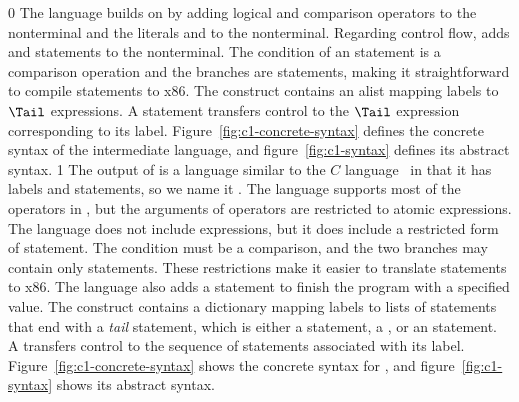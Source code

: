 \documentclass[7x10]{TimesAPriori_MIT}%
\def\racketEd{0}
\def\pythonEd{1}
\def\edition{1}
\newcommand{\pythonColor}[0]{}
\numberwithin{theorem}{chapter}
\numberwithin{definition}{chapter}
\numberwithin{equation}{chapter}
\begin{document}
{\if\edition\racketEd
%
The \LangCIf{} language builds on \LangCVar{} by adding logical and
comparison operators to the \Exp{} nonterminal and the literals
\TRUE{} and \FALSE{} to the \Arg{} nonterminal.  Regarding control
flow, \LangCIf{} adds  and  statements to the
\Tail{} nonterminal. The condition of an  statement is a
comparison operation and the branches are  statements,
making it straightforward to compile  statements to x86.  The
 construct contains an alist mapping labels to $\Tail$
expressions. A  statement transfers control to the $\Tail$
expression corresponding to its label.
%
Figure~\ref{fig:c1-concrete-syntax} defines the concrete syntax of the
\LangCIf{} intermediate language, and figure~\ref{fig:c1-syntax}
defines its abstract syntax.
%
\fi}
%
{\if\edition\pythonEd\pythonColor
%
The output of  is a language similar to the
$C$ language~\citep{Kernighan:1988nx} in that it has labels and
 statements, so we name it \LangCIf{}.  
%
The \LangCIf{} language supports most of the operators in \LangIf{}, but
the arguments of operators are restricted to atomic expressions. The
\LangCIf{} language does not include  expressions, but it does
include a restricted form of  statement. The condition must be
a comparison, and the two branches may contain only 
statements. These restrictions make it easier to translate 
statements to x86.  The \LangCIf{} language also adds a 
statement to finish the program with a specified value.
%
The  construct contains a dictionary mapping labels to
lists of statements that end with a \emph{tail} statement, which is
either a  statement, a , or an
 statement.
%
A  transfers control to the sequence of statements
associated with its label.
%
Figure~\ref{fig:c1-concrete-syntax} shows the concrete syntax for \LangCIf{},
and figure~\ref{fig:c1-syntax} shows its
abstract syntax.
%
\fi}
%

\newcommand{\CifGrammarRacket}{
\begin{array}{lcl}
\Atm &::=& \itm{bool} \\
\itm{cmp} &::= & \code{eq?} \MID \code{<} \MID \code{<=} \MID \code{>} \MID \code{>=} \\
\Exp &::=& \CNOT{\Atm} \MID \LP \itm{cmp}~\Atm~\Atm\RP \\
\Tail &::= & \key{goto}~\itm{label}\key{;}\\
   &\MID& \key{if}~\LP \itm{cmp}~\Atm~\Atm \RP~ \key{goto}~\itm{label}\key{;} ~\key{else}~\key{goto}~\itm{label}\key{;} 
\end{array}
}
\end{document}
